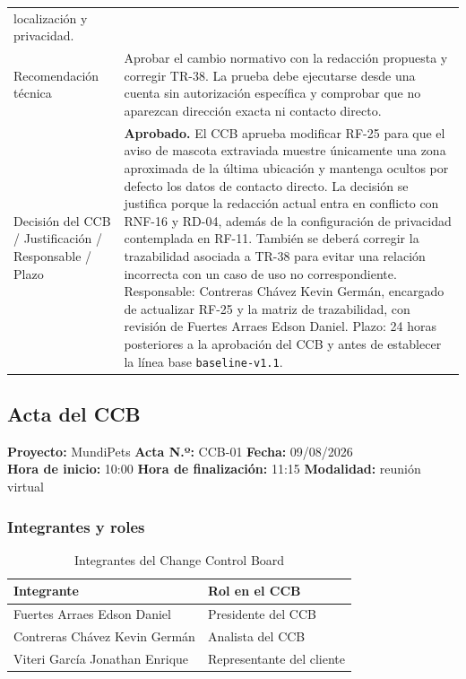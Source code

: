 \documentclass[journal,onecolumn]{IEEEtran}
\begin{document}
\begin{longtable}{L{4.0cm} L{9.5cm}}
		localización y privacidad. \\
		\addlinespace
		Recomendación técnica &
		Aprobar el cambio normativo con la redacción propuesta y corregir TR-38. La prueba debe
		ejecutarse desde una cuenta sin autorización específica y comprobar que no aparezcan dirección
		exacta ni contacto directo. \\
		\addlinespace
		Decisión del CCB / Justificación / Responsable / Plazo &
		\textbf{Aprobado.} El CCB aprueba modificar RF-25 para que el aviso de mascota extraviada
		muestre únicamente una zona aproximada de la última ubicación y mantenga ocultos por defecto
		los datos de contacto directo. La decisión se justifica porque la redacción actual entra en
		conflicto con RNF-16 y RD-04, además de la configuración de privacidad contemplada en RF-11.
		También se deberá corregir la trazabilidad asociada a TR-38 para evitar una relación
		incorrecta con un caso de uso no correspondiente. Responsable: Contreras Chávez Kevin Germán,
		encargado de actualizar RF-25 y la matriz de trazabilidad, con revisión de Fuertes Arraes
		Edson Daniel. Plazo: 24 horas posteriores a la aprobación del CCB y antes de establecer la
		línea base \texttt{baseline-v1.1}. \\
	\end{longtable}
	\newpage
	\subsection{Acta del CCB}
	\label{sec:acta-ccb}
	
	\noindent\textbf{Proyecto:} MundiPets \quad\textbf{Acta N.º:} CCB-01 \quad
	\textbf{Fecha:} 09/08/2026\\
	\textbf{Hora de inicio:} 10:00 \quad \textbf{Hora de finalización:} 11:15 \quad
	\textbf{Modalidad:} reunión virtual
	
	\subsubsection{Integrantes y roles}
	
	\begin{table}[H]
		\centering
		\caption{Integrantes del Change Control Board}
		\label{tab:ccb-roles}
		\begin{tabular}{L{6.0cm} L{5.5cm}}
			\toprule
			\textbf{Integrante} & \textbf{Rol en el CCB} \\
			\midrule
			Fuertes Arraes Edson Daniel      & Presidente del CCB \\
			Contreras Chávez Kevin Germán    & Analista del CCB \\
			Viteri García Jonathan Enrique   & Representante del cliente \\
			\bottomrule
		\end{tabular}
	\end{table}
	
\end{document}
